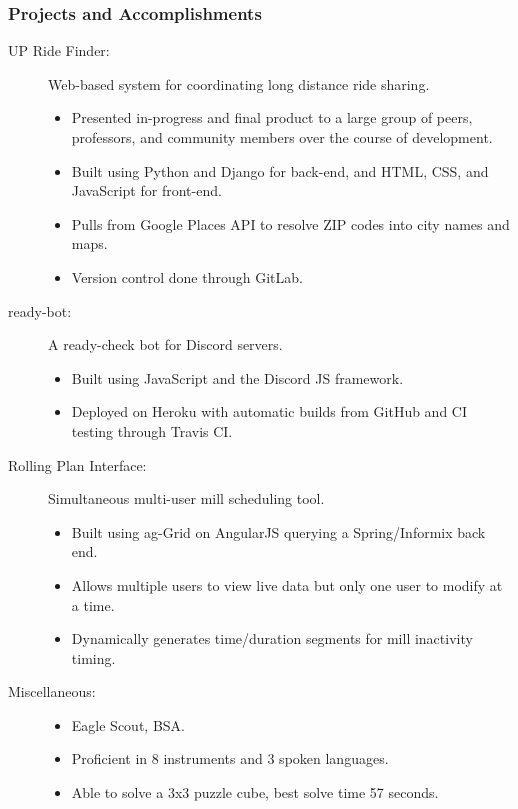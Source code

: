 \documentclass{article}
\begin{document}
\subsubsection*{Projects and Accomplishments}
    \begin{description}
        \item[UP Ride Finder:] Web-based system for coordinating long distance ride sharing.
            \begin{itemize}
                \item Presented in-progress and final product to a large group of peers, professors, and community members over the course of development.
                \item Built using Python and Django for back-end, and HTML, CSS, and JavaScript for front-end.
                \item Pulls from Google Places API to resolve ZIP codes into city names and maps.
                \item Version control done through GitLab.
            \end{itemize}

            \vspace{0.5em}

        \item[ready-bot:] A ready-check bot for Discord servers.
            \begin{itemize}
                \item Built using JavaScript and the Discord JS framework.
                \item Deployed on Heroku with automatic builds from GitHub and CI testing through Travis CI.
            \end{itemize}

            \vspace{0.5em}

        \item[Rolling Plan Interface:] Simultaneous multi-user mill scheduling tool.
            \begin{itemize}
                \item Built using ag-Grid on AngularJS querying a Spring/Informix back end.
                \item Allows multiple users to view live data but only one user to modify at a time.
                \item Dynamically generates time/duration segments for mill inactivity timing.
            \end{itemize}

            \vspace{0.5em}

        \item[Miscellaneous:] \hfill
            \begin{itemize}
                \item Eagle Scout, BSA.
                \item Proficient in 8 instruments and 3 spoken languages.
                \item Able to solve a 3x3 puzzle cube, best solve time 57 seconds.
        \end{itemize}
    \end{description}
\end{document}
